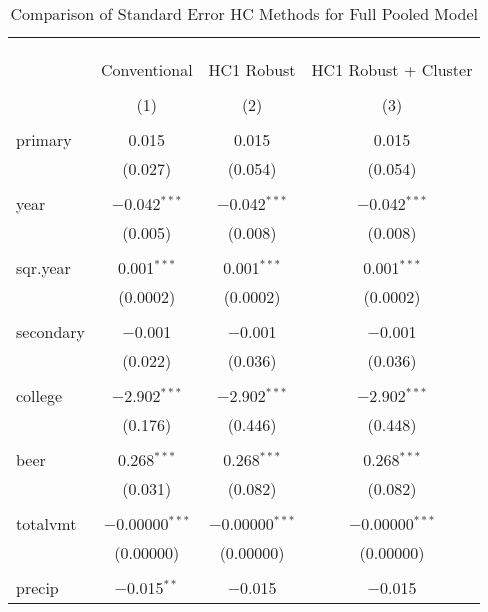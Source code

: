 \documentclass{article}
\begin{document}
\begin{table}[!htbp] \centering 
  \caption{Comparison of Standard Error HC Methods for Full Pooled Model} 
  \label{tab:3b1} 
\footnotesize 
\begin{tabular}{@{\extracolsep{5pt}}lccc} 
\\[-1.8ex]\hline 
\hline \\[-1.8ex] 
\\[-1.8ex] & \multicolumn{3}{c}{ } \\ 
 & Conventional & HC1 Robust & HC1 Robust + Cluster \\ 
\\[-1.8ex] & (1) & (2) & (3)\\ 
\hline \\[-1.8ex] 
 primary & 0.015 & 0.015 & 0.015 \\ 
  & (0.027) & (0.054) & (0.054) \\ 
  & & & \\ 
 year & $-$0.042$^{***}$ & $-$0.042$^{***}$ & $-$0.042$^{***}$ \\ 
  & (0.005) & (0.008) & (0.008) \\ 
  & & & \\ 
 sqr.year & 0.001$^{***}$ & 0.001$^{***}$ & 0.001$^{***}$ \\ 
  & (0.0002) & (0.0002) & (0.0002) \\ 
  & & & \\ 
 secondary & $-$0.001 & $-$0.001 & $-$0.001 \\ 
  & (0.022) & (0.036) & (0.036) \\ 
  & & & \\ 
 college & $-$2.902$^{***}$ & $-$2.902$^{***}$ & $-$2.902$^{***}$ \\ 
  & (0.176) & (0.446) & (0.448) \\ 
  & & & \\ 
 beer & 0.268$^{***}$ & 0.268$^{***}$ & 0.268$^{***}$ \\ 
  & (0.031) & (0.082) & (0.082) \\ 
  & & & \\ 
 totalvmt & $-$0.00000$^{***}$ & $-$0.00000$^{***}$ & $-$0.00000$^{***}$ \\ 
  & (0.00000) & (0.00000) & (0.00000) \\ 
  & & & \\ 
 precip & $-$0.015$^{**}$ & $-$0.015 & $-$0.015 \\ 

\end{tabular}
\end{table}
\end{document}
